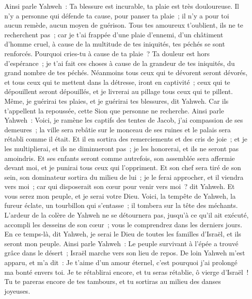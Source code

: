 \begin{multicols}{2}
Ainsi parle Yahweh~: Ta blessure est incurable, ta plaie est très douloureuse.
Il n'y a personne qui défende ta cause, pour panser ta plaie~; il n'y a pour toi aucun remède, aucun moyen de guérison.
Tous tes amoureux t'oublient, ils ne te recherchent pas~; car je t'ai frappée d'une plaie d'ennemi, d'un châtiment d'homme cruel, à cause de la multitude de tes iniquités, tes péchés se sont renforcés.
Pourquoi cries-tu à cause de ta plaie~? Ta douleur est hors d'espérance~; je t'ai fait ces choses à cause de la grandeur de tes iniquités, du grand nombre de tes péchés.
Néanmoins tous ceux qui te dévorent seront dévorés, et tous ceux qui te mettent dans la détresse, iront en captivité~; ceux qui te dépouillent seront dépouillés, et je livrerai au pillage tous ceux qui te pillent.
Même, je guérirai tes plaies, et je guérirai tes blessures, dit Yahweh. Car ils t'appellent la repoussée, cette Sion que personne ne recherche.
Ainsi parle Yahweh~: Voici, je ramène les captifs des tentes de Jacob, j'ai compassion de ses demeures~; la ville sera rebâtie sur le monceau de ses ruines et le palais sera rétabli comme il était.
Et il en sortira des remerciements et des cris de joie~; et je les multiplierai, et ils ne diminueront pas~; je les honorerai, et ils ne seront pas amoindris.
Et ses enfants seront comme autrefois, son assemblée sera affermie devant moi, et je punirai tous ceux qui l'oppriment.
Et son chef sera tiré de son sein, son dominateur sortira du milieu de lui~; je le ferai approcher, et il viendra vers moi~; car qui disposerait son cœur pour venir vers moi~? dit Yahweh.
Et vous serez mon peuple, et je serai votre Dieu.
Voici, la tempête de Yahweh, la fureur éclate, un tourbillon qui s'entasse~; il tombera sur la tête des méchants. 
L'ardeur de la colère de Yahweh ne se détournera pas, jusqu'à ce qu'il ait exécuté, accompli les desseins de son cœur~; vous le comprendrez dans les derniers jours.
\VerseOne{}En ce temps-là, dit Yahweh, je serai le Dieu de toutes les familles d'Israël, et ils seront mon peuple.
Ainsi parle Yahweh~: Le peuple survivant à l'épée a trouvé grâce dans le désert~; Israël marche vers son lieu de repos.
De loin Yahweh m'est apparu, et m'a dit~: Je t'aime d'un amour éternel, c'est pourquoi j'ai prolongé ma bonté envers toi.
Je te rétablirai encore, et tu seras rétablie, ô vierge d'Israël~! Tu te pareras encore de tes tambours, et tu sortiras au milieu des danses joyeuses.

\end{multicols}
